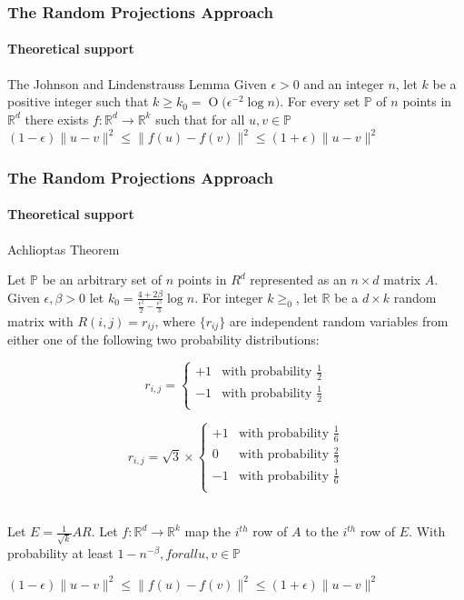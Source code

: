 \documentclass{beamer}
\newcommand{\BigO}[1]{\ensuremath{\operatorname{O}\bigl(#1\bigr)}}
\begin{document}
\begin{frame}
  	\frametitle{The Random Projections Approach}
  	\framesubtitle{Theoretical support}
  	\begin{block}{The Johnson and Lindenstrauss Lemma}
Given $\epsilon > 0$ and an integer $n$, let $k$ be a positive integer such that $k \geq k_{0} = \BigO{\epsilon^{-2}  \log n} $. For every set $\mathbb{P}$ of $n$ points in $\mathbb{R}^{d}$ there exists $f: \mathbb{R}^{d}  \rightarrow \mathbb{R}^{k}$ such that for all $u,v \in \mathbb{P}$\\
  	\bigskip
  	\centering
  	$(1-\epsilon)\lVert u-v \rVert^{2} \le \lVert f(u)-f(v) \rVert^{2}\le (1+\epsilon)\lVert u-v \rVert^{2}$\\
  	\end{block}
\end{frame}
\begin{frame}
  	\frametitle{The Random Projections Approach}
  	\framesubtitle{Theoretical support}
\begin{block}{Achlioptas Theorem}

  	  Let $\mathbb{P}$ be an arbitrary set of $n$ points in $R^{d}$ represented as an $n \times d$ matrix $A$. Given $\epsilon, \beta >0$ let $k_{0}=\frac{4+2\beta}{\frac{\epsilon^{2}}{2}-\frac{\epsilon^{3}}{3}}\log n$. For integer $k \ge_{0}$, let $\mathbb{R}$ be a $d \times k$ random matrix with $R(i,j)=r_{ij}$, where $\{r_{ij}\}$ are independent random variables from either one of the following two probability distributions:\\

\begin{minipage}[b]{0.45\linewidth}
\[
 r_{i,j} =
  \begin{cases}
   +1 & \text{with probability } \frac{1}{2} \\
  -1 & \text{with probability } \frac{1}{2} \\
  \end{cases}
\]  	  
\end{minipage}
\begin{minipage}[b]{0.45\linewidth}
\[
 r_{i,j} = \sqrt{3}\times 
  \begin{cases}
   +1 & \text{with probability } \frac{1}{6} \\
   0 & \text{with probability } \frac{2}{3} \\
  -1 & \text{with probability } \frac{1}{6} \\
  \end{cases}
\]
\end{minipage}\\
\bigskip
Let $E=\frac{1}{\sqrt{k}}AR$. Let $f: \mathbb{R}^{d}\rightarrow \mathbb{R}^{k}$ map the $i^{th}$ row of $A$ to the $i^{th}$ row of $E$.
\bigskip
With probability at least $1-n^{-\beta}, for all u, v \in \mathbb{P} $

\centering
$(1-\epsilon)\lVert u-v \rVert^{2} \le \lVert f(u)-f(v) \rVert^{2}\le (1+\epsilon)\lVert u-v \rVert^{2}$\\
\end{block}
\end{frame}
\end{document}
